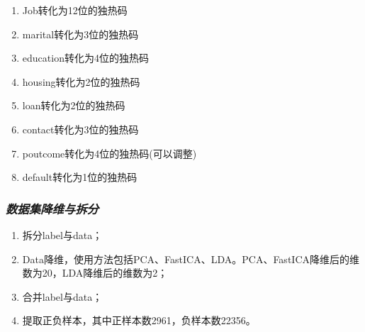 \documentclass{acm_proc_article-sp}
\begin{document}
\begin{enumerate}\setlength\itemsep{0mm} 
       \item  Job转化为12位的独热码
       \item  marital转化为3位的独热码
       \item  education转化为4位的独热码
       \item  housing转化为2位的独热码
       \item  loan转化为2位的独热码
       \item  contact转化为3位的独热码
       \item  poutcome转化为4位的独热码(可以调整)
       \item  default转化为1位的独热码
\end{enumerate}

\subsubsection{\textsl{数据集降维与拆分}}
\begin{enumerate}\setlength\itemsep{0mm} 
       \item  拆分label与data；
       \item  Data降维，使用方法包括PCA、FastICA、LDA。PCA、FastICA降维后的维数为20，LDA降维后的维数为2；
       \item  合并label与data；
       \item  提取正负样本，其中正样本数2961，负样本数22356。
\end{enumerate}
\end{document}
